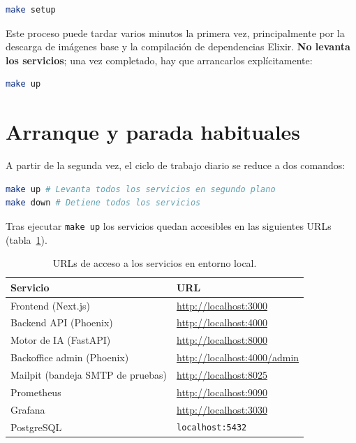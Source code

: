 \begin{lstlisting}[language=bash]
make setup
\end{lstlisting}

Este proceso puede tardar varios minutos la primera vez, principalmente por la descarga de imágenes base y la compilación de dependencias Elixir. \textbf{No levanta los servicios}; una vez completado, hay que arrancarlos explícitamente:

\begin{lstlisting}[language=bash]
make up
\end{lstlisting}

\section{Arranque y parada habituales}

A partir de la segunda vez, el ciclo de trabajo diario se reduce a dos comandos:

\begin{lstlisting}[language=bash]
make up # Levanta todos los servicios en segundo plano
make down # Detiene todos los servicios
\end{lstlisting}

Tras ejecutar \texttt{make up} los servicios quedan accesibles en las siguientes URLs (tabla~\ref{tab:urls}).

\begin{table}[h]
\centering
\caption{URLs de acceso a los servicios en entorno local.}
\label{tab:urls}
\begin{tabular}{ll}
\hline
\textbf{Servicio} & \textbf{URL} \\
\hline
Frontend (Next.js) & \url{http://localhost:3000} \\
Backend API (Phoenix) & \url{http://localhost:4000} \\
Motor de IA (FastAPI) & \url{http://localhost:8000} \\
Backoffice admin (Phoenix) & \url{http://localhost:4000/admin} \\
Mailpit (bandeja SMTP de pruebas) & \url{http://localhost:8025} \\
Prometheus & \url{http://localhost:9090} \\
Grafana & \url{http://localhost:3030} \\
PostgreSQL & \texttt{localhost:5432} \\
\hline
\end{tabular}
\end{table}

